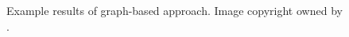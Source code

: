 \begin{figure}[!h]
	\centering
    \caption[Example results of graph-based approach]{Example results of graph-based approach. Image copyright owned by \cite{msnadine}.}
    \label{fig:graphbasedres}
\end{figure}